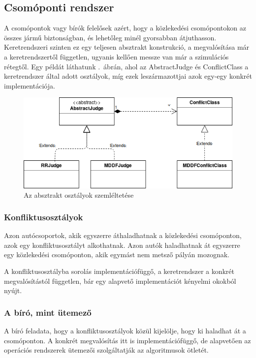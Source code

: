 \documentclass{article}
\begin{document}
			
	\subsection{Csomóponti rendszer}
		A csomópontok vagy bírók felelősek azért, hogy a közlekedési csomópontokon az összes jármű biztonságban, és lehetőleg minél gyorsabban átjuthasson. Keretrendszeri szinten ez egy teljesen absztrakt konstrukció, a megvalósítása már a keretrendszertől független, ugyanis kellően messze van már a szimulációs rétegtől. Egy példát láthatunk .~ábrán, ahol az AbstractJudge és ConflictClass a keretrendszer által adott osztályok, míg ezek leszármazottjai azok egy-egy konkrét implementációja.
		
		\begin{figure}[h]
			\centering
			\includegraphics[width=1.0\textwidth]{absztrbiro.png} 
			\caption{Az absztrakt osztályok szemléltetése}
			\label{pic:abs}
		\end{figure}
		
		\subsubsection{Konfliktusosztályok}
			Azon autócsoportok, akik egyszerre áthaladhatnak a közlekedési csomóponton, azok egy konfliktusosztályt alkothatnak. Azon autók haladhatnak át egyszerre egy közlekedési csomóponton, akik egymást nem metsző pályán mozognak.
			
			A konfliktusosztályba sorolás implementációfüggő, a keretrendszer a konkrét megvalósítástól független, bár egy alapvető implementációt kényelmi okokból nyújt.
			
		\subsubsection{A bíró, mint ütemező}
			A bíró feladata, hogy a konfliktusosztályok közül kijelölje, hogy ki haladhat át a csomóponton. A konkrét megvalósítás itt is implementációfüggő, de alapvetően az operációs rendszerek ütemezői szolgáltatják az algoritmusok ötletét.
			
\end{document}
